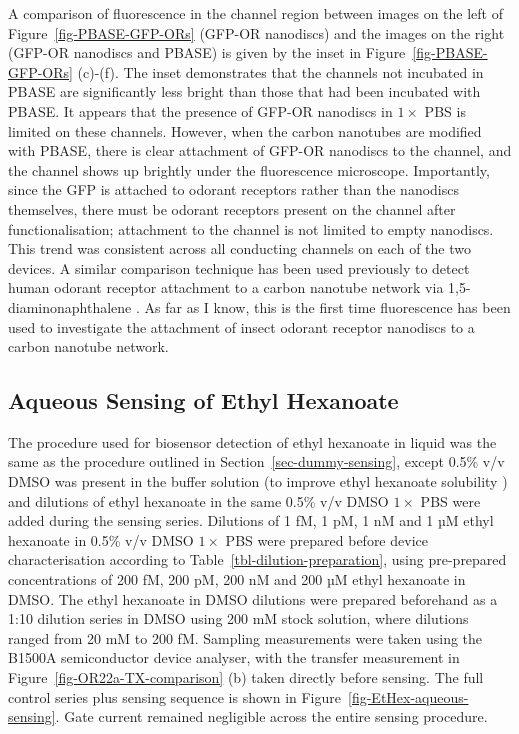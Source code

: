 \documentclass[
  a4paper,
]{scrbook}
\begin{document}
A comparison of fluorescence in the channel region between images on the
left of Figure~\ref{fig-PBASE-GFP-ORs} (GFP-OR nanodiscs) and the images
on the right (GFP-OR nanodiscs and PBASE) is given by the inset in
Figure~\ref{fig-PBASE-GFP-ORs} (c)-(f). The inset demonstrates that the
channels not incubated in PBASE are significantly less bright than those
that had been incubated with PBASE. It appears that the presence of
GFP-OR nanodiscs in \(1 \times\) PBS is limited on these channels.
However, when the carbon nanotubes are modified with PBASE, there is
clear attachment of GFP-OR nanodiscs to the channel, and the channel
shows up brightly under the fluorescence microscope. Importantly, since
the GFP is attached to odorant receptors rather than the nanodiscs
themselves, there must be odorant receptors present on the channel after
functionalisation; attachment to the channel is not limited to empty
nanodiscs. This trend was consistent across all conducting channels on
each of the two devices. A similar comparison technique has been used
previously to detect human odorant receptor attachment to a carbon
nanotube network via 1,5-diaminonaphthalene \autocite{Lee2012b}. As far
as I know, this is the first time fluorescence has been used to
investigate the attachment of insect odorant receptor nanodiscs to a
carbon nanotube network.

\hypertarget{sec-EtHex-aqueous-sensing}{%
\subsection{Aqueous Sensing of Ethyl
Hexanoate}\label{sec-EtHex-aqueous-sensing}}

The procedure used for biosensor detection of ethyl hexanoate in liquid
was the same as the procedure outlined in
Section~\ref{sec-dummy-sensing}, except 0.5\% v/v DMSO was present in
the buffer solution (to improve ethyl hexanoate solubility
\autocite{Galvao2014}) and dilutions of ethyl hexanoate in the same
0.5\% v/v DMSO \(1 \times\) PBS were added during the sensing series.
Dilutions of 1 fM, 1 pM, 1 nM and 1 µM ethyl hexanoate in 0.5\% v/v DMSO
\(1 \times\) PBS were prepared before device characterisation according
to Table~\ref{tbl-dilution-preparation}, using pre-prepared
concentrations of 200 fM, 200 pM, 200 nM and 200 µM ethyl hexanoate in
DMSO. The ethyl hexanoate in DMSO dilutions were prepared beforehand as
a 1:10 dilution series in DMSO using 200 mM stock solution, where
dilutions ranged from 20 mM to 200 fM. Sampling measurements were taken
using the B1500A semiconductor device analyser, with the transfer
measurement in Figure~\ref{fig-OR22a-TX-comparison} (b) taken directly
before sensing. The full control series plus sensing sequence is shown
in Figure~\ref{fig-EtHex-aqueous-sensing}. Gate current remained
negligible across the entire sensing procedure.
\end{document}
